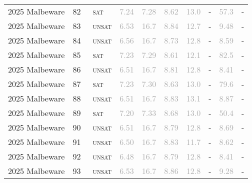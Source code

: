 \begin{center}
{\begin{longtable}{@{}llllllllll@{}}
2025 Malbeware & 82 & ~\textsc{sat} & \textcolor{darkgray}{7.24} & \textcolor{darkgray}{7.28} & \textcolor{darkgray}{8.62} & \textcolor{darkgray}{13.0} & - & \textcolor{darkgray}{57.3} & - \\
2025 Malbeware & 83 & ~\textsc{unsat} & \textcolor{darkgray}{6.53} & \textcolor{darkgray}{16.7} & \textcolor{darkgray}{8.84} & \textcolor{darkgray}{12.7} & - & \textcolor{darkgray}{9.48} & - \\
2025 Malbeware & 84 & ~\textsc{unsat} & \textcolor{darkgray}{6.56} & \textcolor{darkgray}{16.7} & \textcolor{darkgray}{8.73} & \textcolor{darkgray}{12.8} & - & \textcolor{darkgray}{8.59} & - \\
2025 Malbeware & 85 & ~\textsc{sat} & \textcolor{darkgray}{7.23} & \textcolor{darkgray}{7.29} & \textcolor{darkgray}{8.61} & \textcolor{darkgray}{12.1} & - & \textcolor{darkgray}{82.5} & - \\
2025 Malbeware & 86 & ~\textsc{unsat} & \textcolor{darkgray}{6.51} & \textcolor{darkgray}{16.7} & \textcolor{darkgray}{8.81} & \textcolor{darkgray}{12.8} & - & \textcolor{darkgray}{8.41} & - \\
2025 Malbeware & 87 & ~\textsc{sat} & \textcolor{darkgray}{7.23} & \textcolor{darkgray}{7.30} & \textcolor{darkgray}{8.63} & \textcolor{darkgray}{13.0} & - & \textcolor{darkgray}{79.6} & - \\
2025 Malbeware & 88 & ~\textsc{unsat} & \textcolor{darkgray}{6.51} & \textcolor{darkgray}{16.7} & \textcolor{darkgray}{8.83} & \textcolor{darkgray}{13.1} & - & \textcolor{darkgray}{8.87} & - \\
2025 Malbeware & 89 & ~\textsc{sat} & \textcolor{darkgray}{7.20} & \textcolor{darkgray}{7.33} & \textcolor{darkgray}{8.68} & \textcolor{darkgray}{13.0} & - & \textcolor{darkgray}{50.4} & - \\
2025 Malbeware & 90 & ~\textsc{unsat} & \textcolor{darkgray}{6.51} & \textcolor{darkgray}{16.7} & \textcolor{darkgray}{8.79} & \textcolor{darkgray}{12.8} & - & \textcolor{darkgray}{8.69} & - \\
2025 Malbeware & 91 & ~\textsc{unsat} & \textcolor{darkgray}{6.50} & \textcolor{darkgray}{16.7} & \textcolor{darkgray}{8.83} & \textcolor{darkgray}{11.7} & - & \textcolor{darkgray}{8.62} & - \\
2025 Malbeware & 92 & ~\textsc{unsat} & \textcolor{darkgray}{6.48} & \textcolor{darkgray}{16.7} & \textcolor{darkgray}{8.79} & \textcolor{darkgray}{12.8} & - & \textcolor{darkgray}{8.41} & - \\
2025 Malbeware & 93 & ~\textsc{unsat} & \textcolor{darkgray}{6.53} & \textcolor{darkgray}{16.7} & \textcolor{darkgray}{8.86} & \textcolor{darkgray}{12.8} & - & \textcolor{darkgray}{9.28} & - \\

\end{longtable}}
\end{center}
